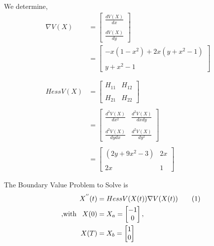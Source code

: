\documentclass[twoside,12pt]{article}
\newcommand\numberthis{\addtocounter{equation}{1}\tag{\theequation}}
\begin{document}
We determine,
\begin{align*}
\nabla V(X) &= \begin{bmatrix}
\frac{dV(X)}{dx}\\\\\frac{dV(X)}{dy}
\end{bmatrix}\\
&= \begin{bmatrix}
-x(1-x^2)+2x(y+x^2-1)\\\\
y+x^2-1
\end{bmatrix}\\
\\
\\
HessV(X) &= \begin{bmatrix}
H_{11} & H_{12}\\\\
H_{21}& H_{22}
\end{bmatrix}\\\\
&=\begin{bmatrix}
\frac{d^2 V(X)}{dx^2} & \frac{d^2 V(X)}{dx dy}\\\\
\frac{d^2 V(X)}{dy dx}& \frac{d^2V(X)}{dy^2}
\end{bmatrix}\\\\
&= \begin{bmatrix}
(2y+9x^2-3)&2x\\\\
2x&1
\end{bmatrix}
\end{align*}


The Boundary Value Problem to Solve is
\begin{align*}
X^{''}(t) &= HessV(X(t)) \nabla V(X(t)) \numberthis\label{p1_1}\\
\;\;\;\text{,with}\;\;\;X(0)&=X_a=\begin{bmatrix}-1\\0\end{bmatrix},\\
\;\;\;X(T)&=X_b=\begin{bmatrix}1\\0\end{bmatrix}
\end{align*}
\end{document}
